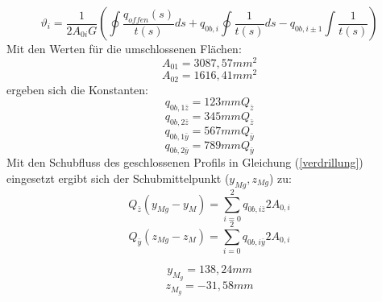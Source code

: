 \begin{equation}
	\vartheta_{i} = \frac{1}{2A_{0i}G}(\oint\frac{q_{offen}(s)}{t(s)}ds+q_{0b,i}\oint\frac{1}{t(s)}ds-q_{0b,i\pm1}\int\frac{1}{t(s)})
\end{equation}
Mit den Werten für die umschlossenen Flächen:
\begin{equation}
	A_{01}=3087,57mm^2
\end{equation}
\begin{equation}
	A_{02}=1616,41mm^2
\end{equation}
ergeben sich die Konstanten:
\begin{equation}
	q_{0b,1\bar{z}}=123mmQ_{\bar{z}}
\end{equation}
\begin{equation}
	q_{0b,2\bar{z}}=345mmQ_{\bar{z}}
\end{equation}
\begin{equation}
	q_{0b,1\bar{y}}=567mmQ_{\bar{y}}
\end{equation}
\begin{equation}
	q_{0b,2\bar{y}}=789mmQ_{\bar{y}}
\end{equation}
Mit den Schubfluss des geschlossenen Profils in Gleichung (\ref{verdrillung}) eingesetzt ergibt sich der Schubmittelpunkt ($y_{Mg}, z_{Mg}$) zu:
\begin{equation}
	Q_{\bar{z}}(y_{Mg}-y_{M})=\sum_{i=0}^{2}q_{0b,i\bar{z}}2A_{0,i}
\end{equation}
\begin{equation}
Q_{\bar{y}}(z_{Mg}-z_{M})=\sum_{i=0}^{2}q_{0b,i\bar{y}}2A_{0,i}
\end{equation}

\begin{equation}
	y_{M_{g}}=138,24mm
\end{equation}
\begin{equation}
	z_{M_{g}}=-31,58mm
\end{equation}

